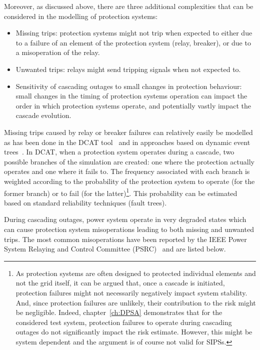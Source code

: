 Moreover, as discussed above, there are three additional complexities that can be considered in the modelling of protection systems:

\begin{itemize}
    \item Missing trips: protection systems might not trip when expected to either due to a failure of an element of the protection system (relay, breaker), or due to a misoperation of the relay.
    \item Unwanted trips: relays might send tripping signals when not expected to.
    \item Sensitivity of cascading outages to small changes in protection behaviour: small changes in the timing of protection systems operation can impact the order in which protection systems operate, and potentially vastly impact the cascade evolution.
\end{itemize}

Missing trips caused by relay or breaker failures can relatively easily be modelled as has been done in the DCAT tool~\cite{DCATphase1} and in approaches based on dynamic event trees~\cite{TwoLevelPSA}. In DCAT, when a protection system operates during a cascade, two possible branches of the simulation are created: one where the protection actually operates and one where it fails to. The frequency associated with each branch is weighted according to the probability of the protection system to operate (for the former branch) or to fail (for the latter)\footnote{As protection systems are often designed to protected individual elements and not the grid itself, it can be argued that, once a cascade is initiated, protection failures might not necessarily negatively impact system stability. And, since protection failures are unlikely, their contribution to the risk might be negligible. Indeed, chapter~\ref{ch:DPSA} demonstrates that for the considered test system, protection failures to operate during cascading outages do not significantly impact the risk estimate. However, this might be system dependent and the argument is of course not valid for SIPSs.}. This probability can be estimated based on standard reliability techniques (\eg fault trees).

During cascading outages, power system operate in very degraded states which can cause protection system misoperations leading to both missing and unwanted trips. The most common misoperations have been reported by the IEEE Power System Relaying and Control Committee (PSRC)~\cite{ProtectionFailuresDemetrios, PSRCreportProtectionMisop, PSRCreportSummaryProtectionMisop} and are listed below.

